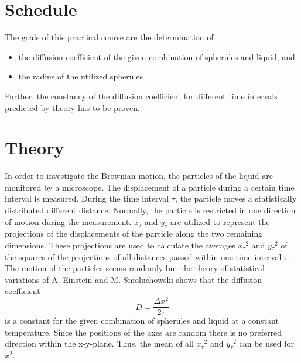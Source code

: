 \documentclass{tudphygp_eng}
\begin{document}
\section{Schedule}

The goals of this practical course are the determination of 
\begin{itemize}
 \item the diffusion coefficient of the given combination of spherules and liquid, and
 \item the radius of the utilized spherules
\end{itemize}

Further, the constancy of the diffusion coefficient for different time intervals predicted by theory has to be proven.

\section{Theory}

In order to investigate the Brownian motion, the particles of the liquid are monitored by a microscope. The displacement of a particle during a certain time interval is measured. During the time interval $\tau$, the particle moves a statistically distributed different distance. Normally, the particle is restricted in one direction of motion during the measurement. $x_\tau$ and $y_\tau$ are utilized to represent the projections of the displacements of the particle along the two remaining dimensions. These projections are used to calculate the averages $x{_\tau}^2$ and $y{_\tau}^2$ of the squares of the projections of all distances passed within one time interval $\tau$. The motion of the particles seems randomly but the theory of statistical variations of A. Einstein and M. Smoluchowski shows that the diffusion coefficient
\begin{equation}
\label{eq:1}
D = \frac{\Delta x^2}{2\tau}
\end{equation}
is a constant for the given combination of spherules and liquid at a constant temperature. Since the positions of the axes are random there is no preferred direction within the x-y-plane. Thus, the mean of all $x{_\tau}^2$ and $y{_\tau}^2$ can be used for $x^2$. 
\end{document}

